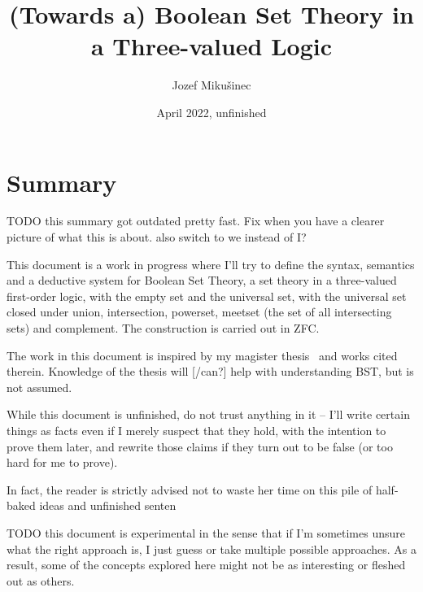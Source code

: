 \documentclass[oneside,12pt]{book}
\title{(Towards a) Boolean Set Theory in a Three-valued Logic}
\author{Jozef Mikušinec}
\date{April 2022, unfinished}
\theoremstyle{definition}
\theoremstyle{remark}
\begin{document}
\frenchspacing

\maketitle
\titleformat{\chapter}{}{}{0em}{\bf\LARGE\thechapter~}


\chapter*{Summary}
TODO this summary got outdated pretty fast. Fix when you have a clearer picture
of what this is about. also switch to we instead of I?

This document is a work in progress where I'll try to define the syntax, semantics
and a deductive system for Boolean Set Theory, a set theory in a three-valued
first-order
logic, with the empty set and the universal set,
with the universal set closed under union, intersection, powerset, meetset (the set
of all intersecting sets) and complement. The construction is carried out in ZFC.

The work in this document is inspired by my magister thesis~\cite{MikusinecMgrThesis}
and works cited therein. Knowledge of the thesis will [/can?] help with understanding
BST, but is not assumed.

While this document is unfinished, do not trust anything in it -- I'll write
certain things as facts even if I merely suspect that they hold, with the intention
to prove them later, and rewrite those claims if they turn out to be false
(or too hard for me to prove).

In fact, the reader is strictly advised not to waste her time on this pile of half-baked
ideas and unfinished senten

TODO this document is experimental in the sense that if I'm sometimes unsure what
the right approach is, I just guess or take multiple possible approaches.
As a result, some of the concepts explored here might not be as interesting or
fleshed out as others.
\end{document}
